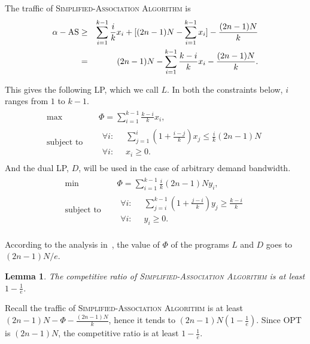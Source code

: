 \documentclass[conference]{IEEEtran}
\newtheorem{lemma}{Lemma}
\begin{document}
  The traffic of {\scshape Simplified-Association Algorithm} is
  \begin{eqnarray*}
    \alpha-\rm{AS} &\geq& \sum_{i=1}^{k-1}\frac{i}{k}x_i+[(2n-1)N-\sum_{i=1}^{k-1}x_i]-\frac{(2n-1)N}{k}\\
       & = &(2n-1)N-\sum_{i=1}^{k-1}\frac{k-i}{k}x_i-\frac{(2n-1)N}{k}.
  \end{eqnarray*}

  This gives the following LP, which we call $L$.  In both the constraints below, $i$ ranges from $1$ to $k-1$.
  \begin{eqnarray*}
    \begin{aligned}
        \mbox{max} & \;\;\;\; \Phi=\sum_{i=1}^{k-1}\frac{k-i}{k}x_i, \\
        \mbox{subject to}& \;\;\;\;
        \begin{aligned}
          \forall i: \;\; & \sum_{j=1}^{i}(1+\frac{i-j}{k})x_j\leq \frac{i}{k}(2n-1)N\\
          \forall i: \;\; & x_i\geq 0.
        \end{aligned}
    \end{aligned}
  \end{eqnarray*}
  And the dual LP, $D$, will be used in the case of arbitrary demand bandwidth.
  \begin{eqnarray*}
    \begin{aligned}
        \mbox{min} & \;\;\;\; \Phi=\sum_{i=1}^{k-1}\frac{i}{k}(2n-1)Ny_i, \\
        \mbox{subject to}& \;\;\;\;
        \begin{aligned}
          \forall i: \;\; & \sum_{j=i}^{k-1}(1+\frac{j-i}{k})y_j\geq \frac{k-i}{k}\\
          \forall i: \;\; & y_i\geq 0.
        \end{aligned}
    \end{aligned}
  \end{eqnarray*}

  According to the analysis in~\cite{Mehta:2007}, the value of $\Phi$ of the programs $L$ and $D$ goes to $(2n-1)N/e$.

  \begin{lemma}
    The competitive ratio of {\scshape Simplified-Association Algorithm} is at least $1-\frac{1}{e}$.
  \end{lemma}
  \begin{IEEEproof}
    Recall the traffic of {\scshape Simplified-Association Algorithm} is at least $(2n-1)N-\Phi-\frac{(2n-1)N}{k}$, hence it tends to $(2n-1)N(1-\frac{1}{e})$. Since OPT is $(2n-1)N$, the competitive ratio is at least $1-\frac{1}{e}$.
  \end{IEEEproof}
\end{document}
